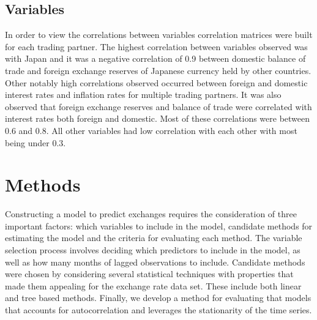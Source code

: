 \documentclass{sig-alternate-05-2015}
\begin{document}

\subsection{Variables}

In order to view the correlations between variables correlation matrices were built for each trading partner. The highest correlation between variables observed was with Japan and it was a negative correlation of 0.9 between domestic balance of trade and foreign exchange reserves of Japanese currency held by other countries. Other notably high correlations observed occurred between foreign and domestic interest rates and inflation rates for multiple trading partners. It was also observed that foreign exchange reserves and balance of trade were correlated with interest rates both foreign and domestic. Most of these correlations were between 0.6 and 0.8. All other variables had low correlation with each other with most being under 0.3.   

\section{Methods}
Constructing a model to predict exchanges requires the consideration of three important factors: which variables to include in the model, candidate methods for estimating the model and the criteria for evaluating each method. The variable selection process involves deciding which predictors to include in the model, as well as how many months of lagged observations to include. Candidate methods were chosen by considering several statistical techniques with properties that made them appealing for the exchange rate data set. These include both linear and tree based methods. Finally, we develop a method for evaluating that models that accounts for autocorrelation and leverages the stationarity of the time series.
\end{document}
